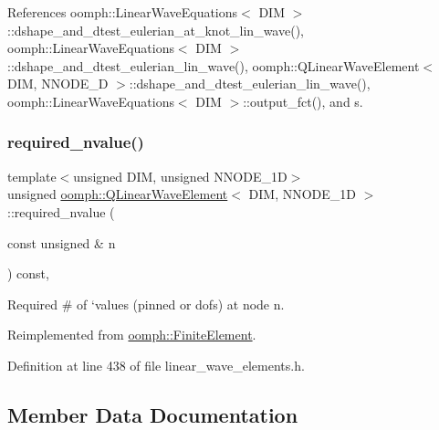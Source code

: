 References oomph\+::\+Linear\+Wave\+Equations$<$ D\+I\+M $>$\+::dshape\+\_\+and\+\_\+dtest\+\_\+eulerian\+\_\+at\+\_\+knot\+\_\+lin\+\_\+wave(), oomph\+::\+Linear\+Wave\+Equations$<$ D\+I\+M $>$\+::dshape\+\_\+and\+\_\+dtest\+\_\+eulerian\+\_\+lin\+\_\+wave(), oomph\+::\+Q\+Linear\+Wave\+Element$<$ D\+I\+M, N\+N\+O\+D\+E\+\_\+D $>$\+::dshape\+\_\+and\+\_\+dtest\+\_\+eulerian\+\_\+lin\+\_\+wave(), oomph\+::\+Linear\+Wave\+Equations$<$ D\+I\+M $>$\+::output\+\_\+fct(), and s.

\mbox{\label{classoomph_1_1QLinearWaveElement_a62c08bf0690b81184694b87424db4d46}} 
\subsubsection{\texorpdfstring{required\+\_\+nvalue()}{required\_nvalue()}}
{\footnotesize\ttfamily template$<$unsigned D\+IM, unsigned N\+N\+O\+D\+E\+\_\+1D$>$ \\
unsigned \hyperlink{classoomph_1_1QLinearWaveElement}{oomph\+::\+Q\+Linear\+Wave\+Element}$<$ D\+IM, N\+N\+O\+D\+E\+\_\+1D $>$\+::required\+\_\+nvalue (\begin{DoxyParamCaption}\item[{const unsigned \&}]{n }\end{DoxyParamCaption}) const\hspace{0.3cm}{\ttfamily [inline]}, {\ttfamily [virtual]}}



Required \# of `values\textquotesingle{} (pinned or dofs) at node n. 



Reimplemented from \hyperlink{classoomph_1_1FiniteElement_a56610c60d5bc2d7c27407a1455471b1a}{oomph\+::\+Finite\+Element}.



Definition at line 438 of file linear\+\_\+wave\+\_\+elements.\+h.



\subsection{Member Data Documentation}
\mbox{\label{classoomph_1_1QLinearWaveElement_aa8b8b5b3e5fa3ab646fc0ce814121712}} 
